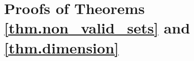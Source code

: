 \documentclass[submission]{FPSAC2023}
\newcommand{\PP}{\mathbb{P}} %
\begin{document}
\section{Proofs of Theorems \ref{thm.non_valid_sets} and \ref{thm.dimension}}
\end{document}
